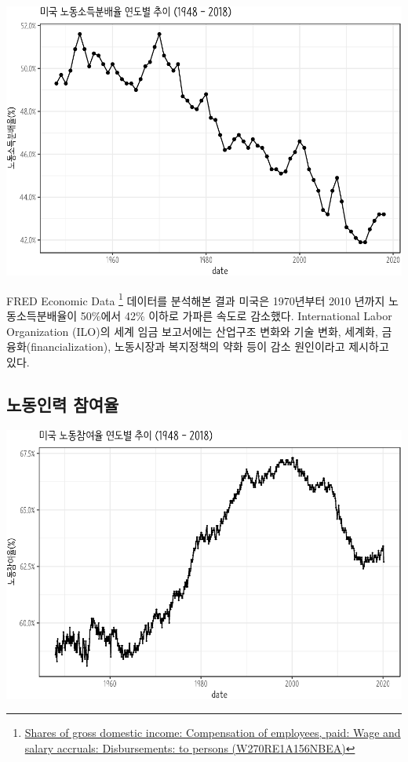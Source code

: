 \documentclass[smallextended]{svjour3}       %
\begin{document}
\begin{center}\includegraphics[width=1\linewidth]{paper_files/figure-latex/labor-share-us-1} \end{center}

FRED Economic Data \footnote{\href{https://fred.stlouisfed.org/series/W270RE1A156NBEA}{Shares
  of gross domestic income: Compensation of employees, paid: Wage and
  salary accruals: Disbursements: to persons (W270RE1A156NBEA)}}
데이터를 분석해본 결과 미국은 1970년부터 2010 년까지 노동소득분배율이
50\%에서 42\% 이하로 가파른 속도로 감소했다. International Labor
Organization (ILO)의 세계 임금 보고서\cite{ilo2015labour}에는 산업구조
변화와 기술 변화, 세계화, 금융화(financialization), 노동시장과
복지정책의 약화 등이 감소 원인이라고 제시하고 있다.

\hypertarget{labor-participation}{%
\subsection{노동인력 참여율}\label{labor-participation}}

\begin{center}\includegraphics[width=1\linewidth]{paper_files/figure-latex/fred-data-labor-participation-1} \end{center}
\end{document}
